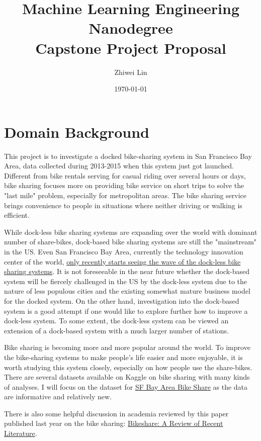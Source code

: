 \documentclass[a4paper]{article}
\title{\textbf{Machine Learning Engineering Nanodegree} \\
\Large Capstone Project Proposal}
\author{Zhiwei Lin}
\date{\today}
\begin{document}
	\maketitle
	
	\section*{Domain Background}
	
	This project is to investigate a docked bike-sharing system in San Francisco Bay Area, data collected during 2013-2015 when this system just got launched. Different from bike rentals serving for casual riding over several hours or days, bike sharing focuses more on providing bike service on short trips to solve the "last mile" problem, especially for metropolitan areas. The bike sharing service brings convenience to people in situations where neither driving or walking is efficient.
	
	While dock-less bike sharing systems are expanding over the world with dominant number of share-bikes, dock-based bike sharing systems are still the "mainstream" in the US. Even San Francisco Bay Area, currently the technology innovation center of the world, \href{https://www.recode.net/2017/10/23/16496908/bike-sharing-dockless-limebike-ofo-motivate-citi-bike-spin}{only recently starts seeing the wave of the dock-less bike sharing systems}. It is not foreseeable in the near future whether the dock-based system will be fiercely challenged in the US by the dock-less system due to the nature of less populous cities and the existing somewhat mature business model for the docked system. On the other hand, investigation into the dock-based system is a good attempt if one would like to explore further how to improve a dock-less system. To some extent, the dock-less system can be viewed an extension of a dock-based system with a much larger number of stations.
	
	Bike sharing is becoming more and more popular around the world. To improve the bike-sharing systems to make people's life easier and more enjoyable, it is worth studying this system closely, especially on how people use the share-bikes. There are several datasets available on Kaggle on bike sharing with many kinds of analyses. I will focus on the dataset for \href{https://www.kaggle.com/benhamner/sf-bay-area-bike-share}{SF Bay Area Bike Share} as the data are informative and relatively new.
	
	There is also some helpful discussion in academia reviewed by this paper published last year on the bike sharing:
	\href{https://nacto.org/wp-content/uploads/2016/02/2016_Fishman_Bikeshare-A-Review-of-Recent-Literature.pdf}{Bikeshare: A Review of Recent Literature}.
	
\end{document}
